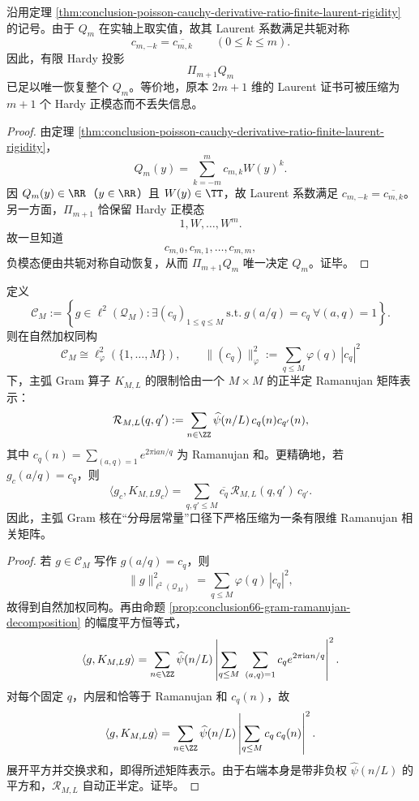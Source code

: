 \begin{corollary}\label{cor:conclusion-poisson-cauchy-halfhardy-lossless-compression}
沿用定理 \ref{thm:conclusion-poisson-cauchy-derivative-ratio-finite-laurent-rigidity} 的记号。由于 \(Q_m\) 在实轴上取实值，故其 Laurent 系数满足共轭对称
\[
c_{m,-k}=\overline{c_{m,k}}
\qquad (0\le k\le m).
\]
因此，有限 Hardy 投影
\[
\Pi_{m+1}Q_m
\]
已足以唯一恢复整个 \(Q_m\)。等价地，原本 \(2m+1\) 维的 Laurent 证书可被压缩为 \(m+1\) 个 Hardy 正模态而不丢失信息。
\end{corollary}
\begin{proof}
由定理 \ref{thm:conclusion-poisson-cauchy-derivative-ratio-finite-laurent-rigidity}，
\[
Q_m(y)=\sum_{k=-m}^{m}c_{m,k}W(y)^k.
\]
因 \(Q_m(y)\in\RR\)（\(y\in\RR\)）且 \(W(y)\in\TT\)，故 Laurent 系数满足
\(
c_{m,-k}=\overline{c_{m,k}}
\)。
另一方面，\(\Pi_{m+1}\) 恰保留 Hardy 正模态
\[
1,W,\dots,W^m.
\]
故一旦知道
\[
c_{m,0},c_{m,1},\dots,c_{m,m},
\]
负模态便由共轭对称自动恢复，从而 \(\Pi_{m+1}Q_m\) 唯一决定 \(Q_m\)。证毕。
\end{proof}

\begin{theorem}\label{thm:conclusion-majorarc-denominator-constant-ramanujan-normal-form}
定义
\[
\mathcal C_M
:=
\left\{
g\in \ell^2(\mathcal Q_M):
\exists (c_q)_{1\le q\le M}\ \text{s.t.}\ 
g(a/q)=c_q\ \forall (a,q)=1
\right\}.
\]
则在自然加权同构
\[
\mathcal C_M\cong \ell^2_\varphi(\{1,\dots,M\}),
\qquad
\|(c_q)\|_\varphi^2:=\sum_{q\le M}\varphi(q)\,|c_q|^2
\]
下，主弧 Gram 算子 \(K_{M,L}\) 的限制恰由一个 \(M\times M\) 的正半定 Ramanujan 矩阵表示：
\[
\mathcal R_{M,L}(q,q')
:=
\sum_{n\in\ZZ}\widehat\psi(n/L)\,c_q(n)c_{q'}(n),
\]
其中 \(c_q(n)=\sum_{(a,q)=1}e^{2\pi\mathrm{i}an/q}\) 为 Ramanujan 和。更精确地，若 \(g_c(a/q)=c_q\)，则
\[
\langle g_c,K_{M,L}g_c\rangle
=
\sum_{q,q'\le M}\overline{c_q}\,\mathcal R_{M,L}(q,q')\,c_{q'}.
\]
因此，主弧 Gram 核在“分母层常量”口径下严格压缩为一条有限维 Ramanujan 相关矩阵。
\end{theorem}
\begin{proof}
若 \(g\in\mathcal C_M\) 写作 \(g(a/q)=c_q\)，则
\[
\|g\|_{\ell^2(\mathcal Q_M)}^2=\sum_{q\le M}\varphi(q)\,|c_q|^2,
\]
故得到自然加权同构。再由命题 \ref{prop:conclusion66-gram-ramanujan-decomposition} 的幅度平方恒等式，
\[
\langle g,K_{M,L}g\rangle
=
\sum_{n\in\ZZ}\widehat\psi(n/L)
\left|
\sum_{q\le M}\ \sum_{(a,q)=1} c_q e^{2\pi\mathrm{i}an/q}
\right|^2.
\]
对每个固定 \(q\)，内层和恰等于 Ramanujan 和 \(c_q(n)\)，故
\[
\langle g,K_{M,L}g\rangle
=
\sum_{n\in\ZZ}\widehat\psi(n/L)
\left|
\sum_{q\le M} c_q\,c_q(n)
\right|^2.
\]
展开平方并交换求和，即得所述矩阵表示。由于右端本身是带非负权 \(\widehat\psi(n/L)\) 的平方和，\(\mathcal R_{M,L}\) 自动正半定。证毕。
\end{proof}

